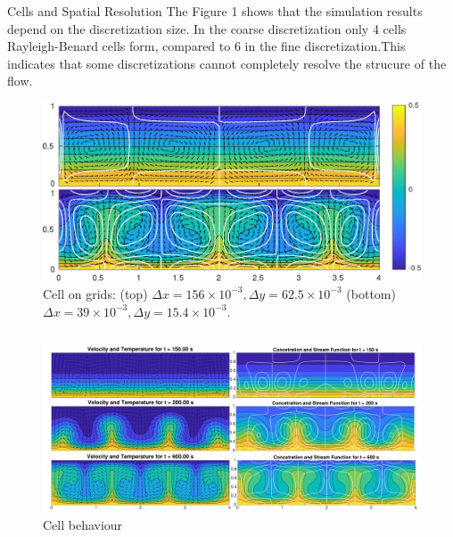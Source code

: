 \documentclass[final]{beamer}
\newlength{\onecolwid}
\newlength{\twocolwid}
\begin{document}
\begin{frame}[t]
\begin{columns}[t]
\begin{column}{\twocolwid}
\begin{columns}[t,totalwidth=\twocolwid]
\begin{column}{\onecolwid}
\begin{block}{Cells and Spatial Resolution}
	The Figure 1 shows that the simulation results depend on the discretization size. In the coarse discretization only 4 cells Rayleigh-Benard cells form, compared to 6 in the fine discretization.This indicates that some discretizations cannot completely resolve the strucure of the flow.
	\vspace{1em}
\begin{figure}
\includegraphics[width=1.0\linewidth]{images/cells.pdf}
	\caption{\hspace{1em}Cell on grids: (top) $\Delta x=156\times10^{-3}, \Delta y=62.5\times10^{-3}$ (bottom) $\Delta x=39\times10^{-3}, \Delta y=15.4\times10^{-3}.$}
\end{figure}
\end{block}


\end{column} %

\end{columns} %

\vspace{-2em}
\begin{figure}
\includegraphics[width=1.0\linewidth]{images/figure1.pdf}
\caption{Cell behaviour}
\end{figure}


\end{column}
\end{columns}
\end{frame}
\end{document}

